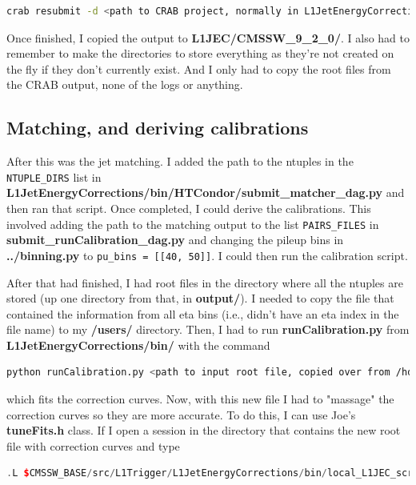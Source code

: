 \begin{lstlisting}[belowskip=-0.7cm, language=sh, numbers=none]
crab resubmit -d <path to CRAB project, normally in L1JetEnergyCorrections/crab/ directory>
\end{lstlisting}

Once finished, I copied the output to \textbf{L1JEC/CMSSW\_9\_2\_0/}. I also had to remember to make the directories to store everything as they're not created on the fly if they don't currently exist. And I only had to copy the root files from the CRAB output, none of the logs or anything.


\subsection{Matching, and deriving calibrations}

After this was the jet matching. I added the path to the ntuples in the \texttt{NTUPLE\_DIRS} list in \textbf{L1JetEnergyCorrections/bin/HTCondor/submit\_matcher\_dag.py} and then ran that script. Once completed, I could derive the calibrations. This involved adding the path to the matching output to the list \texttt{PAIRS\_FILES} in \textbf{submit\_runCalibration\_dag.py} and changing the pileup bins in \textbf{../binning.py} to \texttt{pu\_bins = [[40, 50]]}. I could then run the calibration script.

After that had finished, I had root files in the directory where all the ntuples are stored (up one directory from that, in \textbf{output/}). I needed to copy the file that contained the information from all eta bins (i.e., didn't have an eta index in the file name) to my \textbf{/users/} directory. Then, I had to run \textbf{runCalibration.py} from \textbf{L1JetEnergyCorrections/bin/} with the command

\begin{lstlisting}[belowskip=-0.7cm, language=sh, numbers=none]
python runCalibration.py <path to input root file, copied over from /hdfs> <path and name of new root file> --redo-correction-fit --inherit-params --stage2
\end{lstlisting}

which fits the correction curves. Now, with this new file I had to "massage" the correction curves so they are more accurate. To do this, I can use Joe's \textbf{tuneFits.h} \ROOT class. If I open a \ROOT session in the directory that contains the new root file with correction curves and type

\begin{lstlisting}[belowskip=-0.7cm, language=C++, numbers=none]
.L $CMSSW_BASE/src/L1Trigger/L1JetEnergyCorrections/bin/local_L1JEC_scripts/tuneFits.h+
\end{lstlisting}


